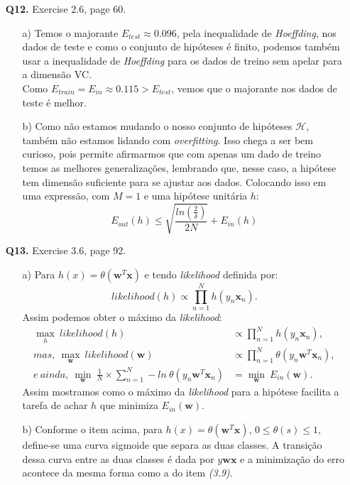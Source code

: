 \documentclass[12pt]{article}
\begin{document}
\begin{enumerate}
\item [\textbf{Q12.}] Exercise 2.6, page 60.
	\begin{addmargin}[1em]{2em}
		\begin{itemize}
			\item[a)] Temos o majorante $E_{test} \approx 0.096$, pela inequalidade de \textit{Hoeffding}, nos dados de teste e como o conjunto de hipóteses é finito, podemos também usar a inequalidade de \textit{Hoeffding} para os dados de treino sem apelar para a dimensão VC.\\
			Como $E_{train} = E_{in} \approx 0.115 > E_{test}$, vemos que o majorante nos dados de teste é melhor.
			\item[b)] Como não estamos mudando o nosso conjunto de hipóteses $\mathcal{H}$, também não estamos lidando com \textit{overfitting}. Isso chega a ser bem curioso, pois permite afirmarmos que com apenas um dado de treino temos as melhores generalizações, lembrando que, nesse caso, a  hipótese tem dimensão suficiente para se ajustar aos dados. Colocando isso em uma expressão, com $M = 1$ e uma hipótese unitária $h$: \[E_{out}(h) \leq \sqrt{\frac{ln \left( \frac{2}{\delta} \right)}{2N}} + E_{in}(h)\]
		\end{itemize}
	\end{addmargin}
\item [\textbf{Q13.}] Exercise 3.6, page 92.
	\begin{addmargin}[1em]{2em}
		\begin{itemize}
			\item[a)] Para $h(x) = \theta(\mathbf{w}^T \mathbf{x})$ e tendo \textit{likelihood} definida por: \[likelihood(h)\propto \prod_{n=1}^Nh(y_n \mathbf{x}_n).\]
			Assim podemos obter o máximo da \textit{likelihood}:
			\begin{align*}
				\max_h\ likelihood(h) & \propto \prod_{n=1}^Nh(y_n \mathbf{x}_n),\\
				mas,\ \max_\mathbf{w}\ likelihood(\mathbf{w}) & \propto \prod_{n=1}^N\theta(y_n \mathbf{w}^T \mathbf{x}_n),\\
				e\ ainda,\ \min_\mathbf{w}\ \frac{1}{N} \times \sum_{n=1}^{N}-ln\ \theta(y_n \mathbf{w}^T \mathbf{x}_n) & = \min_\mathbf{w}\ E_{in}(\mathbf{w}).
			\end{align*}
			Assim mostramos como o máximo da \textit{likelihood} para a hipótese facilita a tarefa de achar $h$ que minimiza $E_{in}(\mathbf{w})$.
			\item[b)] Conforme o item acima, para $h(x) = \theta(\mathbf{w}^T \mathbf{x})$, $0 \leq \theta(s) \leq 1$, define-se uma curva sigmoide que separa as duas classes. A transição dessa curva entre as duas classes é dada por $y \mathbf{w} \mathbf{x}$ e a minimização do erro acontece da mesma forma como a do item \textit{(3.9)}.

\end{itemize}
\end{addmargin}
\end{enumerate}
\end{document}
